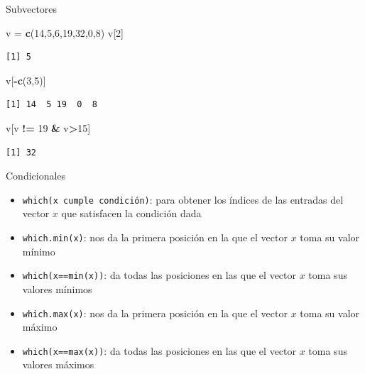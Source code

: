 \documentclass[
  ignorenonframetext,
]{beamer}
\newenvironment{Shaded}{\begin{snugshade}}{\end{snugshade}}
\newcommand{\DecValTok}[1]{\textcolor[rgb]{0.00,0.00,0.81}{#1}}
\newcommand{\FunctionTok}[1]{\textcolor[rgb]{0.13,0.29,0.53}{\textbf{#1}}}
\newcommand{\NormalTok}[1]{#1}
\newcommand{\OtherTok}[1]{\textcolor[rgb]{0.56,0.35,0.01}{#1}}
\newcommand{\SpecialCharTok}[1]{\textcolor[rgb]{0.81,0.36,0.00}{\textbf{#1}}}
\providecommand{\tightlist}{%
  \setlength{\itemsep}{0pt}\setlength{\parskip}{0pt}}
\begin{document}
\begin{frame}[fragile]{Subvectores}
\label{subvectores-2}
\begin{Shaded}
\begin{Highlighting}[]
\NormalTok{v }\OtherTok{=} \FunctionTok{c}\NormalTok{(}\DecValTok{14}\NormalTok{,}\DecValTok{5}\NormalTok{,}\DecValTok{6}\NormalTok{,}\DecValTok{19}\NormalTok{,}\DecValTok{32}\NormalTok{,}\DecValTok{0}\NormalTok{,}\DecValTok{8}\NormalTok{)}
\NormalTok{v[}\DecValTok{2}\NormalTok{]}
\end{Highlighting}
\end{Shaded}

\begin{verbatim}
[1] 5
\end{verbatim}

\begin{Shaded}
\begin{Highlighting}[]
\NormalTok{v[}\SpecialCharTok{{-}}\FunctionTok{c}\NormalTok{(}\DecValTok{3}\NormalTok{,}\DecValTok{5}\NormalTok{)]}
\end{Highlighting}
\end{Shaded}

\begin{verbatim}
[1] 14  5 19  0  8
\end{verbatim}

\begin{Shaded}
\begin{Highlighting}[]
\NormalTok{v[v }\SpecialCharTok{!=} \DecValTok{19} \SpecialCharTok{\&}\NormalTok{ v}\SpecialCharTok{\textgreater{}}\DecValTok{15}\NormalTok{]}
\end{Highlighting}
\end{Shaded}

\begin{verbatim}
[1] 32
\end{verbatim}
\end{frame}

\begin{frame}[fragile]{Condicionales}
\label{condicionales}
\begin{itemize}
\tightlist
\item
  \texttt{which(x\ cumple\ condición)}: para obtener los índices de las
  entradas del vector \(x\) que satisfacen la condición dada
\item
  \texttt{which.min(x)}: nos da la primera posición en la que el vector
  \(x\) toma su valor mínimo
\item
  \texttt{which(x==min(x))}: da todas las posiciones en las que el
  vector \(x\) toma sus valores mínimos
\item
  \texttt{which.max(x)}: nos da la primera posición en la que el vector
  \(x\) toma su valor máximo
\item
  \texttt{which(x==max(x))}: da todas las posiciones en las que el
  vector \(x\) toma sus valores máximos
\end{itemize}
\end{frame}
\end{document}
